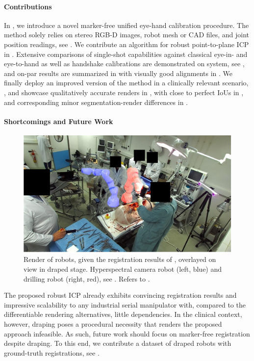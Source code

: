 \paragraph{Contributions} In , we introduce a novel marker-free unified eye-hand calibration procedure. The method solely relies on stereo RGB-D images, robot mesh or CAD files, and joint position readings, see . We contribute an algorithm for robust point-to-plane ICP in . Extensive comparisons of single-shot capabilities against classical eye-in- and eye-to-hand as well as handshake calibrations are demonstrated on system, see , and on-par results are summarized in  with visually good alignments in . We finally deploy an improved version of the method in a clinically relevant scenario, , and showcase qualitatively accurate renders in , with close to perfect IoUs in , and corresponding minor segmentation-render differences in .

\paragraph{Shortcomings and Future Work}
\begin{figure}[tb]
    \centering
    \includegraphics[width=\textwidth]{conclusion/img/draped_ground_truth.pdf}
    \caption{Render of robots, given the registration results of , overlayed on view in draped stage. Hyperspectral camera robot (left, blue) and drilling robot (right, red), see . Refers to .}
    \label{con:fig:draped_ground_truth}
\end{figure}
The proposed robust ICP already exhibits convincing registration results and impressive scalability to any industrial serial manipulator with, compared to the differentiable rendering alternatives, little dependencies. In the clinical context, however, draping poses a procedural necessity that renders the proposed approach infeasible. As such, future work should focus on marker-free registration despite draping. To this end, we contribute a dataset of draped robots with ground-truth registrations, see .

